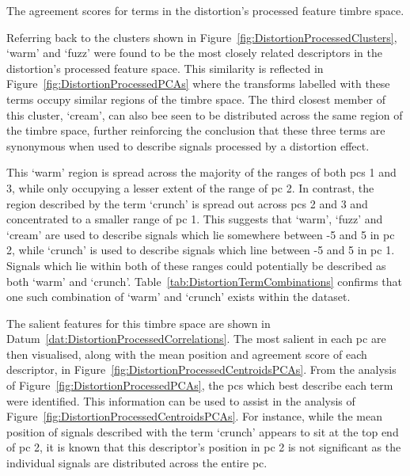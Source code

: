 			\begin{table}[h!]
				\centering
				
				\caption{The agreement scores for terms in the 
					 distortion's processed feature timbre space.}
				\label{tab:DistortionProcessedAgreements}
			\end{table}

			Referring back to the clusters shown in Figure~\ref{fig:DistortionProcessedClusters}, `warm' and
			`fuzz' were found to be the most closely related descriptors in the distortion's processed feature
			space. This similarity is reflected in Figure~\ref{fig:DistortionProcessedPCAs} where the
			transforms labelled with these terms occupy similar regions of the timbre space. The third closest
			member of this cluster, `cream', can also bee seen to be distributed across the same region of the
			timbre space, further reinforcing the conclusion that these three terms are synonymous when used to
			describe signals processed by a distortion effect.

			This `warm' region is spread across the majority of the ranges of both \acrshort{pc}s 1 and 3,
			while only occupying a lesser extent of the range of \acrshort{pc} 2. In contrast, the region
			described by the term `crunch' is spread out across \acrshort{pc}s 2 and 3 and concentrated to a
			smaller range of \acrshort{pc} 1. This suggests that `warm', `fuzz' and `cream' are used to
			describe signals which lie somewhere between -5 and 5 in \acrshort{pc} 2, while `crunch' is used to
			describe signals which line between -5 and 5 in \acrshort{pc} 1.  Signals which lie within both of
			these ranges could potentially be described as both `warm' and `crunch'.
			Table~\ref{tab:DistortionTermCombinations} confirms that one such combination of `warm' and
			`crunch' exists within the dataset.

			The salient features for this timbre space are shown in
			Datum~\ref{dat:DistortionProcessedCorrelations}. The most salient in each \acrshort{pc} are then
			visualised, along with the mean position and agreement score of each descriptor, in
			Figure~\ref{fig:DistortionProcessedCentroidsPCAs}. From the analysis of
			Figure~\ref{fig:DistortionProcessedPCAs}, the \acrshort{pc}s which best describe each term were
			identified. This information can be used to assist in the analysis of
			Figure~\ref{fig:DistortionProcessedCentroidsPCAs}. For instance, while the mean position of signals
			described with the term `crunch' appears to sit at the top end of \acrshort{pc} 2, it is known that
			this descriptor's position in \acrshort{pc} 2 is not significant as the individual signals are
			distributed across the entire \acrshort{pc}.


